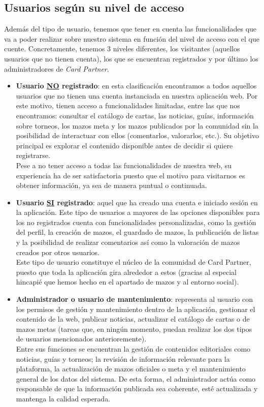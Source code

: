 \documentclass[10pt]{article}
\begin{document}
	\subsection{Usuarios según su nivel de acceso}
	Además del tipo de usuario, tenemos que tener en cuenta las funcionalidades que va a poder realizar sobre nuestro sistema en función del nivel de acceso con el que cuente. Concretamente, tenemos 3 niveles diferentes, los visitantes (aquellos usuarios que no tienen cuenta), los que se encuentran registrados y por último los administradores de \textit{Card Partner}.
	\begin{itemize}
		\item \textbf{Usuario \underline{NO} registrado}: en esta clasificación encontramos a todos aquellos usuarios que no tienen una cuenta instanciada en nuestra aplicación web. Por este motivo, tienen acceso a funcionalidades limitadas, entre las que nos encontramos: consultar el catálogo de cartas, las noticias, guías, información sobre torneos, los mazos meta y los mazos publicados por la comunidad sin la posibilidad de interactuar con ellos (comentarlos, valorarlos, etc.). Su objetivo principal es explorar el contenido disponible antes de decidir si quiere registrarse.\\
		Pese a no tener acceso a todas las funcionalidades de nuestra web, su experiencia ha de ser satisfactoria puesto que el motivo para visitarnos es obtener información, ya sea de manera puntual o continuada.
		\item \textbf{Usuario \underline{SI} registrado}: aquel que ha creado una cuenta e iniciado sesión en la aplicación. Este tipo de usuarios a mayores de las opciones disponibles para los no registrados cuenta con funcionalidades personalizadas, como la gestión del perfil, la creación de mazos, el guardado de mazos, la publicación de listas y la posibilidad de realizar comentarios así como la valoración de mazos creados por otros usuarios.\\
		Este tipo de usuario constituye el núcleo de la comunidad de Card Partner, puesto que toda la aplicación gira alrededor a estos (gracias al especial hincapié que hemos hecho en el apartado de mazos y al entorno social).
		\item \textbf{Administrador o usuario de mantenimiento}: representa al usuario con los permisos de gestión y mantenimiento dentro de la aplicación, gestionar el contenido de la web, publicar noticias, actualizar el catálogo de cartas o de mazos metas (tareas que, en ningún momento, puedan realizar los dos tipos de usuarios mencionados anterioremente).\\
		Entre sus funciones se encuentran la gestión de contenidos editoriales como noticias, guías y torneos; la revisión de información relevante para la plataforma, la actualización de mazos oficiales o meta y el mantenimiento general de los datos del sistema. De esta forma, el administrador actúa como responsable de que la información publicada sea coherente, esté actualizada y mantenga la calidad esperada.
	\end{itemize}
	
\end{document}

